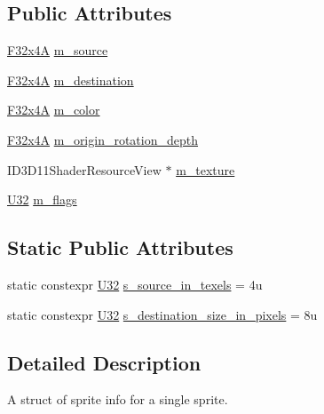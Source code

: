 \subsection*{Public Attributes}
\begin{DoxyCompactItemize}
\item 
\hyperlink{namespacemage_a0b6ac82244eb3edc5eb66c88a3ddef13}{F32x4A} \hyperlink{structmage_1_1_sprite_info_a9b9a0885e4c0927ab0310b810a5d2306}{m\+\_\+source}
\item 
\hyperlink{namespacemage_a0b6ac82244eb3edc5eb66c88a3ddef13}{F32x4A} \hyperlink{structmage_1_1_sprite_info_a297e27f13e1a0cc0d150658e8a0233b9}{m\+\_\+destination}
\item 
\hyperlink{namespacemage_a0b6ac82244eb3edc5eb66c88a3ddef13}{F32x4A} \hyperlink{structmage_1_1_sprite_info_ac2da3c6930c0682a3854f22a47a9a406}{m\+\_\+color}
\item 
\hyperlink{namespacemage_a0b6ac82244eb3edc5eb66c88a3ddef13}{F32x4A} \hyperlink{structmage_1_1_sprite_info_aea7fe05a8be92e45134bae349986c032}{m\+\_\+origin\+\_\+rotation\+\_\+depth}
\item 
I\+D3\+D11\+Shader\+Resource\+View $\ast$ \hyperlink{structmage_1_1_sprite_info_aea9963f991406a050bc5759fb05cfd5e}{m\+\_\+texture}
\item 
\hyperlink{namespacemage_a41c104c036fba3756a74e19f793eeaa1}{U32} \hyperlink{structmage_1_1_sprite_info_a9f3802944651a58e02831e5f2cb4a53e}{m\+\_\+flags}
\end{DoxyCompactItemize}
\subsection*{Static Public Attributes}
\begin{DoxyCompactItemize}
\item 
static constexpr \hyperlink{namespacemage_a41c104c036fba3756a74e19f793eeaa1}{U32} \hyperlink{structmage_1_1_sprite_info_a2a67b4908c2851013e754124bc304fa9}{s\+\_\+source\+\_\+in\+\_\+texels} = 4u
\item 
static constexpr \hyperlink{namespacemage_a41c104c036fba3756a74e19f793eeaa1}{U32} \hyperlink{structmage_1_1_sprite_info_a202b61bc7afeef1e1cbcc568f020c086}{s\+\_\+destination\+\_\+size\+\_\+in\+\_\+pixels} = 8u
\end{DoxyCompactItemize}


\subsection{Detailed Description}
A struct of sprite info for a single sprite. 

